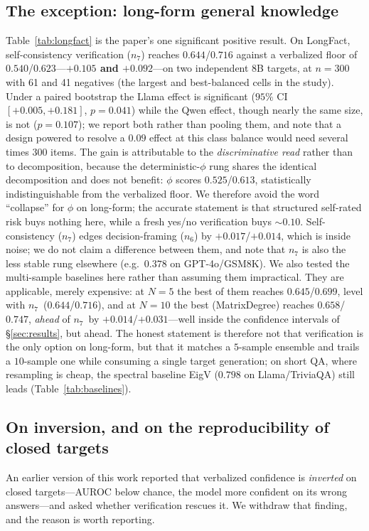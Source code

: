 \documentclass[11pt]{article}
\newcommand{\nsc}{$n_7$}       %
\begin{document}
\subsection{The exception: long-form general knowledge}\label{sec:longfact}
Table~\ref{tab:longfact} is the paper's one significant positive result. On LongFact,
self-consistency verification (\nsc) reaches $0.644$/$0.716$ against a verbalized floor of
$0.540$/$0.623$---\textbf{$+0.105$ and $+0.092$}---on two independent 8B targets, at $n{=}300$
with 61 and 41 negatives (the largest and best-balanced cells in the study). Under a paired
bootstrap the Llama effect is significant ($95\%$ CI $[+0.005,+0.181]$, $p{=}0.041$) while the
Qwen effect, though nearly the same size, is not ($p{=}0.107$); we report both rather than
pooling them, and note that a design powered to resolve a $0.09$ effect at this class balance
would need several times $300$ items. The gain is
attributable to the \emph{discriminative read} rather than to decomposition, because the
deterministic-$\phi$ rung shares the identical decomposition and does not benefit: $\phi$
scores $0.525$/$0.613$, statistically indistinguishable from the verbalized floor. We
therefore avoid the word ``collapse'' for $\phi$ on long-form; the accurate statement is that
structured self-rated risk buys nothing here, while a fresh yes/no verification buys $\sim0.10$.
Self-consistency ($n_7$) edges decision-framing ($n_6$) by $+0.017$/$+0.014$, which is inside
noise; we do not claim a difference between them, and note that $n_7$ is also the less stable
rung elsewhere (e.g.\ $0.378$ on GPT-4o/GSM8K). We also tested the multi-sample baselines here rather than assuming them impractical. They are
applicable, merely expensive: at $N{=}5$ the best of them reaches $0.645$/$0.699$, level with
\nsc\ ($0.644$/$0.716$), and at $N{=}10$ the best (MatrixDegree) reaches $0.658$/$0.747$,
\emph{ahead} of \nsc\ by $+0.014$/$+0.031$---well inside the confidence intervals of
\S\ref{sec:results}, but ahead. The honest statement is therefore not that verification is the
only option on long-form, but that it matches a $5$-sample ensemble and trails a $10$-sample one
while consuming a single target generation; on short QA, where resampling is cheap,
the spectral baseline EigV ($0.798$ on Llama/TriviaQA) still leads (Table~\ref{tab:baselines}).

\subsection{On inversion, and on the reproducibility of closed targets}\label{sec:inversion}
An earlier version of this work reported that verbalized confidence is \emph{inverted} on closed
targets---AUROC below chance, the model more confident on its wrong answers---and asked whether
verification rescues it. We withdraw that finding, and the reason is worth reporting.
\end{document}
